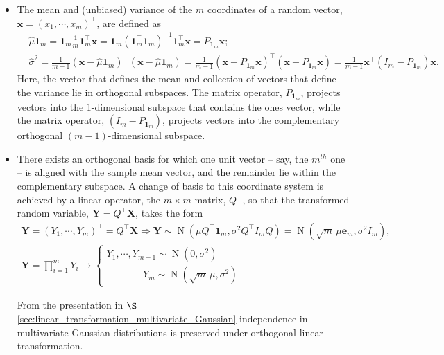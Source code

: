 \documentclass[12pt, twoside, draft]{article}
\begin{document}
\begin{itemize}
\item The  mean and (unbiased) variance of the $m$ coordinates of a random vector, $\mathbf{x} = (x_1, \cdots, x_m)^\top$, are defined as
\begin{align}
&\hat{\mu} \mathbf{1}_m = \mathbf{1}_m \frac{1}{m} \mathbf{1}_m^\top \mathbf{x} = \mathbf{1}_m (\mathbf{1}_m^\top \mathbf{1}_m)^{-1} \mathbf{1}_m^\top \mathbf{x} = P_{\mathbf{1}_m} \mathbf{x}; \\
&\hat{\sigma}^2 = \frac{1}{m-1} (\mathbf{x} - \hat{\mu} \mathbf{1}_m)^\top (\mathbf{x} - \hat{\mu} \mathbf{1}_m)  = \frac{1}{m-1} (\mathbf{x} - P_{\mathbf{1}_m} \mathbf{x})^\top (\mathbf{x} - P_{\mathbf{1}_m} \mathbf{x}) = \frac{1}{m-1} \mathbf{x}^\top (I_m - P_{\mathbf{1}_m}) \mathbf{x}.
\end{align}
Here, the vector that defines the mean and collection of vectors that define the variance lie in orthogonal subspaces.  The matrix operator, $P_{\mathbf{1}_m}$, projects vectors into the 1-dimensional subspace that contains the ones vector, while the matrix operator, $(I_m - P_{\mathbf{1}_m})$, projects vectors into the complementary orthogonal $(m-1)$-dimensional subspace.  

\item There exists an orthogonal basis for which one unit vector -- say, the $m^{th}$ one -- is aligned with the sample mean vector, and the remainder lie within the complementary subspace.  A change of basis to this coordinate system is achieved by a  linear operator, the $m \times m$ matrix, $Q^\top$, so that the transformed random variable, $\mathbf{Y} = Q^\top \mathbf{X}$, takes the form
\begin{multline}\label{eq:transformed_IID_Gaussian}
\mathbf{Y} = (Y_1, \cdots, Y_m)^\top = Q^\top \mathbf{X} \Rightarrow \mathbf{Y} \sim \operatorname{N}(\mu Q^\top \mathbf{1}_m, \sigma^2 Q^\top I_m Q) =  \operatorname{N}(\sqrt{m} \,\mu \mathbf{e}_m, \sigma^2 I_m ), \\
\mathbf{Y} = \prod_{i=1}^{m} Y_i \rightarrow
\begin{cases}
Y_1, \cdots, Y_{m-1} \sim \operatorname{N}(0, \sigma^2) \\
\hspace{45pt}Y_m \sim \operatorname{N}(\sqrt{m} \, \mu, \sigma^2)
\end{cases}
\end{multline}

From the presentation in $\S$\ref{sec:linear_transformation_multivariate_Gaussian} independence in multivariate Gaussian distributions is preserved under orthogonal linear transformation.


\end{itemize}
\end{document}
